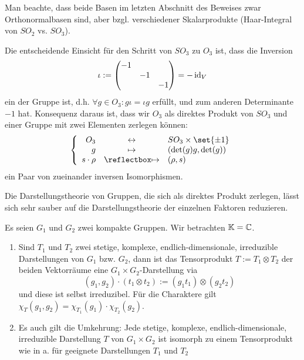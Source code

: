 \begin{remark}
Man beachte, dass beide Basen im letzten Abschnitt des Beweises zwar Orthonormalbasen sind, aber bzgl. verschiedener Skalarprodukte (Haar-Integral von $SO_2$ vs. $SO_3$).
\end{remark}

\begin{remark}
Die entscheidende Einsicht für den Schritt von $SO_3$ zu $O_3$ ist, dass die Inversion
\[\iota := \begin{pmatrix} -1 && \\ &-1& \\ &&-1 \end{pmatrix} = -\operatorname{id}_V\]
ein  der Gruppe ist, d.h. $\forall g\in O_3: g\iota = \iota g$ erfüllt, und zum anderen Determinante $-1$ hat. Konsequenz daraus ist, dass wir $O_3$ als direktes Produkt von $SO_3$ und einer Gruppe mit zwei Elementen zerlegen können:
\[\left\lbrace
\begin{array}{rcl}
O_3 & \leftrightarrow & SO_3 \times \set{\pm 1} \\
g &\mapsto& (\det(g)g, \det(g)) \\
s\cdot\rho &\mapsfrom& (\rho,s) 
\end{array}
\right.\]
ein Paar von zueinander inversen Isomorphismen.

\medbreak
Die Darstellungstheorie von Gruppen, die sich als direktes Produkt zerlegen, lässt sich sehr sauber auf die Darstellungstheorie der einzelnen Faktoren reduzieren.
\end{remark}

\begin{theorem}
Es seien $G_1$ und $G_2$ zwei kompakte Gruppen. Wir betrachten $\mathbb{K}=\mathbb{C}$.
\begin{enumerate}
\item Sind $T_1$ und $T_2$ zwei stetige, komplexe, endlich-dimensionale, irreduzible Darstellungen von $G_1$ bzw. $G_2$, dann ist das Tensorprodukt $T:=T_1\otimes T_2$ der beiden Vektorräume eine $G_1\times G_2$-Darstellung via
\[(g_1,g_2) \cdot (t_1\otimes t_2) := (g_1 t_1) \otimes (g_2 t_2) \]
und diese ist selbst irreduzibel. Für die Charaktere gilt $\chi_T(g_1,g_2) = \chi_{T_1}(g_1)\cdot\chi_{T_2}(g_2)$.
\item Es auch gilt die Umkehrung: Jede stetige, komplexe, endlich-dimensionale, irreduzible Darstellung $T$ von $G_1\times G_2$ ist isomorph zu einem Tensorprodukt wie in a. für geeignete Darstellungen $T_1$ und $T_2$
\end{enumerate}
\end{theorem}

